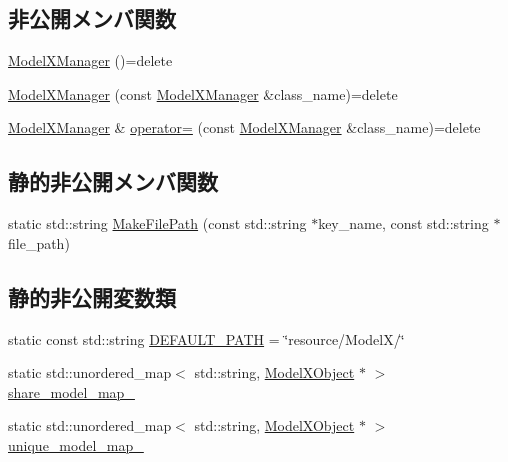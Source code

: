\subsection*{非公開メンバ関数}
\begin{DoxyCompactItemize}
\item 
\mbox{\hyperlink{class_model_x_manager_a4e3620210fca89770bf08b9ec1265357}{Model\+X\+Manager}} ()=delete
\item 
\mbox{\hyperlink{class_model_x_manager_a6df03f9aef72a490b755955e70f12685}{Model\+X\+Manager}} (const \mbox{\hyperlink{class_model_x_manager}{Model\+X\+Manager}} \&class\+\_\+name)=delete
\item 
\mbox{\hyperlink{class_model_x_manager}{Model\+X\+Manager}} \& \mbox{\hyperlink{class_model_x_manager_adc65f6b4b9b06b4a20923245606175d8}{operator=}} (const \mbox{\hyperlink{class_model_x_manager}{Model\+X\+Manager}} \&class\+\_\+name)=delete
\end{DoxyCompactItemize}
\subsection*{静的非公開メンバ関数}
\begin{DoxyCompactItemize}
\item 
static std\+::string \mbox{\hyperlink{class_model_x_manager_a2d367047714442f8a928e4360d11b773}{Make\+File\+Path}} (const std\+::string $\ast$key\+\_\+name, const std\+::string $\ast$file\+\_\+path)
\end{DoxyCompactItemize}
\subsection*{静的非公開変数類}
\begin{DoxyCompactItemize}
\item 
static const std\+::string \mbox{\hyperlink{class_model_x_manager_a745ad339e5fc73cec28d205881a969f8}{D\+E\+F\+A\+U\+L\+T\+\_\+\+P\+A\+TH}} = \char`\"{}resource/ModelX/\char`\"{}
\item 
static std\+::unordered\+\_\+map$<$ std\+::string, \mbox{\hyperlink{class_model_x_object}{Model\+X\+Object}} $\ast$ $>$ \mbox{\hyperlink{class_model_x_manager_ad76c3a0fa42d0e562487f27c20096a12}{share\+\_\+model\+\_\+map\+\_\+}}
\item 
static std\+::unordered\+\_\+map$<$ std\+::string, \mbox{\hyperlink{class_model_x_object}{Model\+X\+Object}} $\ast$ $>$ \mbox{\hyperlink{class_model_x_manager_a77ce902ab239fbb67a9fbbbb87929079}{unique\+\_\+model\+\_\+map\+\_\+}}
\end{DoxyCompactItemize}


